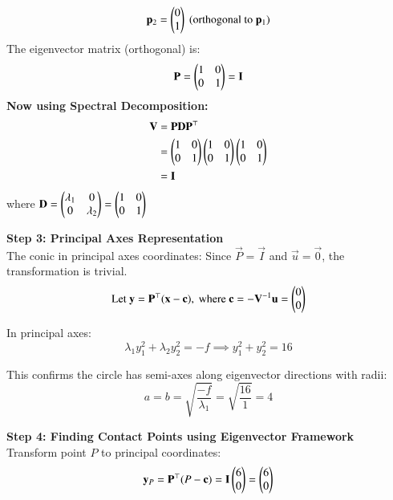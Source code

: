 \documentclass[article]{IEEEtran}
\begin{document}
	\begin{equation}
		 \mathbf{p}_2 = \begin{pmatrix}0\\1\end{pmatrix} \text{ (orthogonal to } \mathbf{p}_1\text{)}
	\end{equation}
The eigenvector matrix (orthogonal) is:
	\begin{equation}
		\mathbf{P} = \begin{pmatrix}1 & 0\\0 & 1\end{pmatrix} = \mathbf{I}
	\end{equation}
	\textbf{Now using Spectral Decomposition:}\\
	\begin{align}
		\mathbf{V} &= \mathbf{P}\mathbf{D}\mathbf{P}^\top\\
		&= \begin{pmatrix}1 & 0\\0 & 1\end{pmatrix}\begin{pmatrix}1 & 0\\0 & 1\end{pmatrix}\begin{pmatrix}1 & 0\\0 & 1\end{pmatrix}\\
		&= \mathbf{I}
	\end{align}
	where $\mathbf{D} = \begin{pmatrix}\lambda_1 & 0\\0 & \lambda_2\end{pmatrix} = \begin{pmatrix}1 & 0\\0 & 1\end{pmatrix}$
	
	\textbf{Step 3: Principal Axes Representation}\\
	The conic in principal axes coordinates: Since $\vec{P} = \vec{I}$ and $\vec{u} = \vec{0}$, the transformation is trivial.
	\begin{equation}
		\text{Let } \mathbf{y} = \mathbf{P}^\top(\mathbf{x} - \mathbf{c}), \text{ where } \mathbf{c} = -\mathbf{V}^{-1}\mathbf{u} = \begin{pmatrix}0\\0\end{pmatrix}
	\end{equation}
	
	In principal axes:
	\begin{equation}
		\lambda_1 y_1^2 + \lambda_2 y_2^2 = -f \implies y_1^2 + y_2^2 = 16
	\end{equation}
	
	This confirms the circle has semi-axes along eigenvector directions with radii:
	\begin{equation}
		a = b = \sqrt{\frac{-f}{\lambda_1}} = \sqrt{\frac{16}{1}} = 4
	\end{equation}
	
	\textbf{Step 4: Finding Contact Points using Eigenvector Framework}\\
	Transform point $P$ to principal coordinates:
	\begin{equation}
		\mathbf{y}_P = \mathbf{P}^\top(P - \mathbf{c}) = \mathbf{I}\begin{pmatrix}6\\0\end{pmatrix} = \begin{pmatrix}6\\0\end{pmatrix}
	\end{equation}
	
\end{document}
